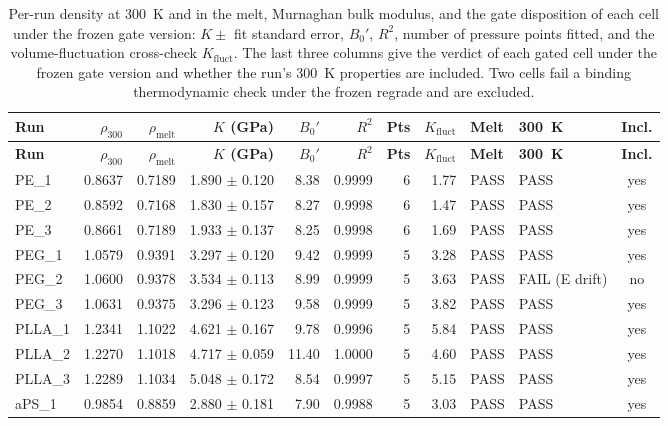 \scriptsize
\begin{longtable}{l r r r r r r r l l c}
\caption{Per-run density at 300~K and in the melt, Murnaghan bulk modulus, and the gate disposition of each cell under the frozen gate version: $K \pm$ fit standard error, $B_0'$, $R^2$, number of pressure points fitted, and the volume-fluctuation cross-check $K_{\mathrm{fluct}}$. The last three columns give the verdict of each gated cell under the frozen gate version and whether the run's 300~K properties are included. Two cells fail a binding thermodynamic check under the frozen regrade and are excluded.} \label{tab:si_rho_k} \\
\toprule
\textbf{Run} & \textbf{$\rho_{300}$} & \textbf{$\rho_{\mathrm{melt}}$} & \textbf{$K$ (GPa)} & \textbf{$B_0'$} & \textbf{$R^2$} & \textbf{Pts} & \textbf{$K_{\mathrm{fluct}}$} & \textbf{Melt} & \textbf{300~K} & \textbf{Incl.} \\
\midrule
\endfirsthead
\toprule
\textbf{Run} & \textbf{$\rho_{300}$} & \textbf{$\rho_{\mathrm{melt}}$} & \textbf{$K$ (GPa)} & \textbf{$B_0'$} & \textbf{$R^2$} & \textbf{Pts} & \textbf{$K_{\mathrm{fluct}}$} & \textbf{Melt} & \textbf{300~K} & \textbf{Incl.} \\
\midrule
\endhead
\bottomrule
\endfoot
PE\_1 & 0.8637 & 0.7189 & 1.890 $\pm$ 0.120 & 8.38 & 0.9999 & 6 & 1.77 & PASS & PASS & yes \\
PE\_2 & 0.8592 & 0.7168 & 1.830 $\pm$ 0.157 & 8.27 & 0.9998 & 6 & 1.47 & PASS & PASS & yes \\
PE\_3 & 0.8661 & 0.7189 & 1.933 $\pm$ 0.137 & 8.25 & 0.9998 & 6 & 1.69 & PASS & PASS & yes \\
PEG\_1 & 1.0579 & 0.9391 & 3.297 $\pm$ 0.120 & 9.42 & 0.9999 & 5 & 3.28 & PASS & PASS & yes \\
PEG\_2 & 1.0600 & 0.9378 & 3.534 $\pm$ 0.113 & 8.99 & 0.9999 & 5 & 3.63 & PASS & FAIL (E drift) & no \\
PEG\_3 & 1.0631 & 0.9375 & 3.296 $\pm$ 0.123 & 9.58 & 0.9999 & 5 & 3.82 & PASS & PASS & yes \\
PLLA\_1 & 1.2341 & 1.1022 & 4.621 $\pm$ 0.167 & 9.78 & 0.9996 & 5 & 5.84 & PASS & PASS & yes \\
PLLA\_2 & 1.2270 & 1.1018 & 4.717 $\pm$ 0.059 & 11.40 & 1.0000 & 5 & 4.60 & PASS & PASS & yes \\
PLLA\_3 & 1.2289 & 1.1034 & 5.048 $\pm$ 0.172 & 8.54 & 0.9997 & 5 & 5.15 & PASS & PASS & yes \\
aPS\_1 & 0.9854 & 0.8859 & 2.880 $\pm$ 0.181 & 7.90 & 0.9988 & 5 & 3.03 & PASS & PASS & yes \\

\end{longtable}
